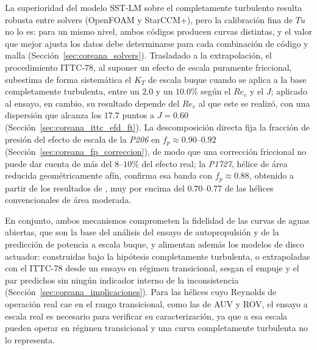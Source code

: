 La superioridad del modelo SST-LM sobre el completamente turbulento resulta robusta entre solvers (OpenFOAM y StarCCM+), pero la calibración fina de $Tu$ no lo es: para un mismo nivel, ambos códigos producen curvas distintas, y el valor que mejor ajusta los datos debe determinarse para cada combinación de código y malla (Sección~\ref{sec:coreana_solvers}). Trasladado a la extrapolación, el procedimiento ITTC-78, al suponer un efecto de escala puramente friccional, subestima de forma sistemática el $K_T$ de escala buque cuando se aplica a la base completamente turbulenta, entre un $2.0$ y un $10.0\%$ según el $Re_c$ y el $J$; aplicado al ensayo, en cambio, su resultado depende del $Re_c$ al que este se realizó, con una dispersión que alcanza los $17.7$ puntos a $J=0.60$ (Sección~\ref{sec:coreana_ittc_efd_ft}). La descomposición directa fija la fracción de
presión del efecto de escala de la \textit{P206} en $f_p\approx0.90$--$0.92$
(Sección~\ref{sec:coreana_fp_correccion}), de modo que una corrección friccional no
puede dar cuenta de más del $8$--$10\%$ del efecto real; la \textit{P1727}, hélice de área
reducida geométricamente afín, confirma esa banda con $f_p\approx0.88$, obtenido a partir
de los resultados de \citet{gallotti2026}, muy por encima
del $0.70$--$0.77$ de las hélices convencionales de área moderada.

En conjunto, ambos mecanismos comprometen la fidelidad de las curvas de aguas abiertas,
que son la base del análisis del ensayo de autopropulsión y de la predicción de potencia
a escala buque, y alimentan además los modelos de disco actuador: construidas bajo la
hipótesis completamente turbulenta, o extrapoladas con el ITTC-78 desde un ensayo en
régimen transicional, sesgan el empuje y el par predichos sin ningún indicador interno
de la inconsistencia (Sección~\ref{sec:coreana_implicaciones}). Para las hélices cuyo Reynolds de
operación real cae en el rango transicional, como las de AUV y ROV, el ensayo a escala
real es necesario para verificar su caracterización, ya que a esa escala pueden operar en
régimen transicional y una curva completamente turbulenta no lo representa.
